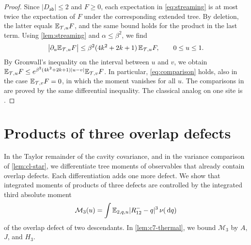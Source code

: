 \begin{proof}
Since $|D_{\mathsf{ab}}|\le2$ and $F\ge0$, each expectation in
\eqref{eq:streaming} is at most twice the expectation of $F$ under the
corresponding extended tree. By deletion, the latter equals
$\mathbb E_{\mathcal T,u}F$, and the same bound holds for the product in the
last term. Using \cref{lem:streaming} and $\alpha\le\beta^2$, we find
\[
 \bigl|\partial_u\mathbb E_{\mathcal T,u}F\bigr|
 \le\beta^2(4k^2+2k+1)\,\mathbb E_{\mathcal T,u}F,\qquad0\le u\le1 .
\]
By Gronwall's inequality on the interval between $u$ and $v$, we obtain
$\mathbb E_{\mathcal T,u}F\le e^{\beta^2(4k^2+2k+1)|u-v|}\mathbb E_{\mathcal T,v}F$.
In particular, \eqref{eq:comparison} holds, also in the case
$\mathbb E_{\mathcal T,v}F=0$, in which the moment vanishes for all $u$. The
comparisons in \cite[Lemmas~2.9 and~4.3]{OpenAIFluctuationScale} are
proved by the same differential inequality. The classical analog
on one site is \cite[Lemma~1.6.4]{TalagrandVolI2011}.
\end{proof}

\section{Products of three overlap defects}\label{subsec:c7-three}

In the Taylor remainder of the cavity covariance, and in the variance
comparison of \cref{lem:cl-star}, we differentiate tree moments of
observables that already contain overlap defects. Each differentiation
adds one more defect. We show that integrated moments of products of
three defects are controlled by the integrated third absolute moment
\begin{equation}\label{eq:cav-M3}
 \mathcal M_3(u)=\int\mathbb E_{2,q,u}|R^-_{12}-q|^3\,\nu(\,\mathrm d q)
\end{equation}
of the overlap defect of two descendants. In \cref{lem:c7-thermal},
we bound $\mathcal M_3$ by $A$, $J$, and $H_3$.

